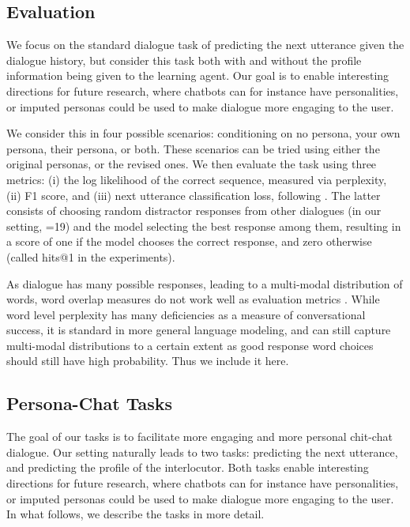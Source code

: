\documentclass[11pt,a4paper]{article}
\begin{document}
\subsection{Evaluation}

We focus on the standard dialogue task of predicting the next utterance given the dialogue history, but consider this task both with and without the profile information being given to the learning agent. Our goal is to enable interesting directions for future research, where chatbots can for instance have personalities, or imputed personas could be used to make dialogue more engaging to the user.

We consider this in four possible scenarios: conditioning on no persona, your own persona, their persona, or both. These scenarios can be tried using either the original personas, or the revised ones.
We then evaluate the task using three metrics: (i) the log likelihood of the correct sequence, measured via perplexity, (ii) F1 score, and (iii) 
next utterance classification loss, following .
The latter consists of choosing  random distractor responses from other dialogues (in our setting, =19) and the model selecting the best response among them, resulting in a score of one if the model chooses the correct response, and zero otherwise (called hits@1 in the experiments). 

As dialogue has many possible responses, leading to a multi-modal distribution of words, word overlap measures do not work well as evaluation metrics \citep{liu2016not,serban2015survey}.
While word level perplexity has many deficiencies as a measure of conversational success, it is standard in more general language modeling, 
and can still capture multi-modal distributions to a certain extent as 
good response word choices should still have high probability.
Thus we include it here.
\fi

\subsection{Persona-Chat Tasks}

The goal of our tasks is to facilitate more engaging and more personal chit-chat dialogue. Our setting naturally leads to two tasks: predicting the next utterance, and predicting the profile of the interlocutor. Both tasks enable interesting directions for future research, where chatbots can for instance have personalities, or imputed personas could be used to make dialogue more engaging to the user. In what follows, we describe the tasks in more detail.
\end{document}
